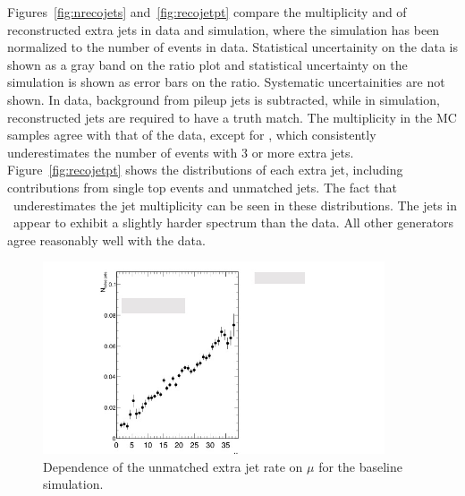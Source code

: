 Figures~\ref{fig:nrecojets} and~\ref{fig:recojetpt} compare the multiplicity and \pt of reconstructed extra jets in data and \ttbar simulation, where the simulation has been normalized to the number of events in data. Statistical uncertainity on the data is shown as a gray band on the ratio plot and statistical uncertainty on the simulation is shown as error bars on the ratio.  Systematic uncertainities are not shown. 
In data, background from pileup jets is subtracted, while in simulation, reconstructed jets are required to have a truth match. The multiplicity 
in the MC samples agree with that of the data, except for \mcnlohw, which consistently underestimates the number of events with 3 or more extra jets. Figure~\ref{fig:recojetpt} shows the \pt distributions of each extra jet, including contributions from single top events and unmatched jets. 
The fact that \mcnlohw\ underestimates the jet multiplicity can be seen in these distributions. The jets in \peight\ appear to exhibit a slightly harder spectrum than the data. All other generators agree reasonably well with the data. 
\begin{figure}
\centering
\includegraphics[width=0.9\textwidth]{fig/MCComp/FalseVsMuNoLbl.jpg}
\caption{Dependence of the unmatched extra jet rate on $\mu$ for the baseline simulation.}
\label{fig:falsecomp}
\end{figure}

